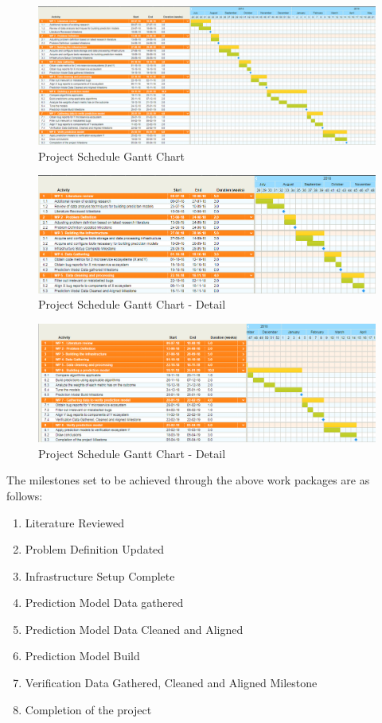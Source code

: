 \begin{figure}[h!]
\centering
\includegraphics[width=1.0\textwidth]{Figures/Gantt_chart_final.png}
\caption{\label{fig:Actual Architecture}Project Schedule Gantt Chart}
\end{figure}

\begin{figure}[h!]
\centering
\includegraphics[width=1.0\textwidth]{Figures/Gantt_detail1.png}
\caption{\label{fig:Actual Architecture}Project Schedule Gantt Chart - Detail}
\end{figure}

\clearpage
\begin{figure}[h!]
\centering
\includegraphics[width=1.0\textwidth]{Figures/Gantt_detail2.png}
\caption{\label{fig:Actual Architecture}Project Schedule Gantt Chart - Detail}
\end{figure}

The milestones set to be achieved through the above work packages are as follows:
\begin{enumerate}
\item Literature Reviewed
\item Problem Definition Updated
\item Infrastructure Setup Complete
\item Prediction Model Data gathered
\item Prediction Model Data Cleaned and Aligned
\item Prediction Model Build
\item Verification Data Gathered, Cleaned and Aligned Milestone
\item Completion of the project
\end{enumerate}